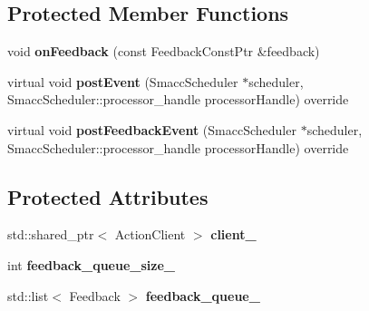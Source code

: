 \subsection*{Protected Member Functions}
\begin{DoxyCompactItemize}
\item 
void {\bfseries on\+Feedback} (const Feedback\+Const\+Ptr \&feedback)\hypertarget{classsmacc_1_1SmaccActionClientBase_a9ba39f09edcf9a4737d8cb0f0d6ee5e2}{}\label{classsmacc_1_1SmaccActionClientBase_a9ba39f09edcf9a4737d8cb0f0d6ee5e2}

\item 
virtual void {\bfseries post\+Event} (Smacc\+Scheduler $\ast$scheduler, Smacc\+Scheduler\+::processor\+\_\+handle processor\+Handle) override\hypertarget{classsmacc_1_1SmaccActionClientBase_a2e2d131731d54ea529f6ff2ebb0c63cd}{}\label{classsmacc_1_1SmaccActionClientBase_a2e2d131731d54ea529f6ff2ebb0c63cd}

\item 
virtual void {\bfseries post\+Feedback\+Event} (Smacc\+Scheduler $\ast$scheduler, Smacc\+Scheduler\+::processor\+\_\+handle processor\+Handle) override\hypertarget{classsmacc_1_1SmaccActionClientBase_a8e500f37853599d32c39483d442ede72}{}\label{classsmacc_1_1SmaccActionClientBase_a8e500f37853599d32c39483d442ede72}

\end{DoxyCompactItemize}
\subsection*{Protected Attributes}
\begin{DoxyCompactItemize}
\item 
std\+::shared\+\_\+ptr$<$ Action\+Client $>$ {\bfseries client\+\_\+}\hypertarget{classsmacc_1_1SmaccActionClientBase_a10d3b707b855c6d360aeeb35e50cd0c7}{}\label{classsmacc_1_1SmaccActionClientBase_a10d3b707b855c6d360aeeb35e50cd0c7}

\item 
int {\bfseries feedback\+\_\+queue\+\_\+size\+\_\+}\hypertarget{classsmacc_1_1SmaccActionClientBase_a834575fe2be93d0ccada8c1d486c49cd}{}\label{classsmacc_1_1SmaccActionClientBase_a834575fe2be93d0ccada8c1d486c49cd}

\item 
std\+::list$<$ Feedback $>$ {\bfseries feedback\+\_\+queue\+\_\+}\hypertarget{classsmacc_1_1SmaccActionClientBase_a66fe8948b906b832b06b5dae469d8dc4}{}\label{classsmacc_1_1SmaccActionClientBase_a66fe8948b906b832b06b5dae469d8dc4}

\end{DoxyCompactItemize}
